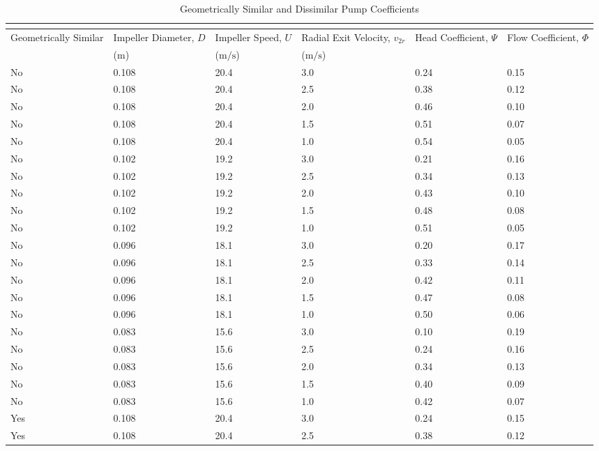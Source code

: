 \begin{longtable}{p{}C{0.10\textwidth}C{0.10\textwidth}C{0.10\textwidth}C{0.10\textwidth}C{0.10\textwidth}}
    \caption{Geometrically Similar and Dissimilar Pump Coefficients} \\
    \label{tab:geometrically_similar_pump_coefficients} \\[-8ex]
    \toprule
    Geometrically Similar & Impeller Diameter, $D$ & Impeller Speed, $U$ & Radial Exit Velocity, $v_{2r}$ & Head Coefficient, $\Psi$ & Flow Coefficient, $\Phi$ \\
    & ($\unit{\meter}$) & ($\unit{\meter\per\second}$) & ($\unit{\meter\per\second}$) & & \\
    \midrule
    No & 0.108 & 20.4 & 3.0 & 0.24 & 0.15 \\
    No & 0.108 & 20.4 & 2.5 & 0.38 & 0.12 \\
    No & 0.108 & 20.4 & 2.0 & 0.46 & 0.10 \\
    No & 0.108 & 20.4 & 1.5 & 0.51 & 0.07 \\
    No & 0.108 & 20.4 & 1.0 & 0.54 & 0.05 \\
    No & 0.102 & 19.2 & 3.0 & 0.21 & 0.16 \\
    No & 0.102 & 19.2 & 2.5 & 0.34 & 0.13 \\
    No & 0.102 & 19.2 & 2.0 & 0.43 & 0.10 \\
    No & 0.102 & 19.2 & 1.5 & 0.48 & 0.08 \\
    No & 0.102 & 19.2 & 1.0 & 0.51 & 0.05 \\
    No & 0.096 & 18.1 & 3.0 & 0.20 & 0.17 \\
    No & 0.096 & 18.1 & 2.5 & 0.33 & 0.14 \\
    No & 0.096 & 18.1 & 2.0 & 0.42 & 0.11 \\
    No & 0.096 & 18.1 & 1.5 & 0.47 & 0.08 \\
    No & 0.096 & 18.1 & 1.0 & 0.50 & 0.06 \\
    No & 0.083 & 15.6 & 3.0 & 0.10 & 0.19 \\
    No & 0.083 & 15.6 & 2.5 & 0.24 & 0.16 \\
    No & 0.083 & 15.6 & 2.0 & 0.34 & 0.13 \\
    No & 0.083 & 15.6 & 1.5 & 0.40 & 0.09 \\
    No & 0.083 & 15.6 & 1.0 & 0.42 & 0.07 \\
    Yes & 0.108 & 20.4 & 3.0 & 0.24 & 0.15 \\
    Yes & 0.108 & 20.4 & 2.5 & 0.38 & 0.12 \\

\end{longtable}
